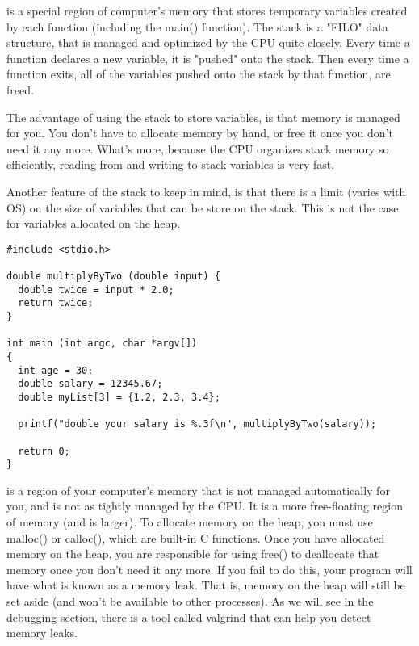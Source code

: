 \documentclass[9pt]{amsart}
\newcommand{\filldots}{\noindent \textbf {\textcolor {blue} {\dotfill}} }
\begin{document}
\begin{multicols}{2}
\filldots 

\noindent {\textcolor {blue} {\em Factory Design Pattern}} 

\filldots 

\noindent {\textcolor {blue} {\em Memory (Stack vs Heap)}} 

\noindent {\textcolor {blue} {\em Stack}} 
is a special region of computer's memory that stores temporary variables created by each function (including the main() function). The stack is a "FILO" data structure, that is managed and optimized by the CPU quite closely. Every time a function declares a new variable, it is "pushed" onto the stack. Then every time a function exits, all of the variables pushed onto the stack by that function, are freed.

The advantage of using the stack to store variables, is that memory is managed for you. You don't have to allocate memory by hand, or free it once you don't need it any more. What's more, because the CPU organizes stack memory so efficiently, reading from and writing to stack variables is very fast. 

Another feature of the stack to keep in mind, is that there is a limit (varies with OS) on the size of variables that can be store on the stack. This is not the case for variables allocated on the heap.

\begin{lstlisting}
#include <stdio.h>

double multiplyByTwo (double input) {
  double twice = input * 2.0;
  return twice;
}

int main (int argc, char *argv[])
{
  int age = 30;
  double salary = 12345.67;
  double myList[3] = {1.2, 2.3, 3.4};

  printf("double your salary is %.3f\n", multiplyByTwo(salary));

  return 0;
}
\end{lstlisting}

\noindent {\textcolor {blue} {\em Heap}} 
 is a region of your computer's memory that is not managed automatically for you, and is not as tightly managed by the CPU. It is a more free-floating region of memory (and is larger). To allocate memory on the heap, you must use malloc() or calloc(), which are built-in C functions. Once you have allocated memory on the heap, you are responsible for using free() to deallocate that memory once you don't need it any more. If you fail to do this, your program will have what is known as a memory leak. That is, memory on the heap will still be set aside (and won't be available to other processes). As we will see in the debugging section, there is a tool called valgrind that can help you detect memory leaks.


\end{multicols}
\end{document}

